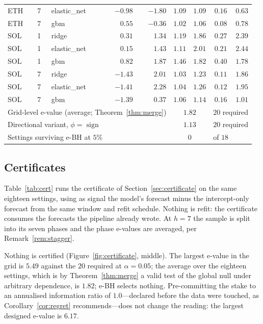 \documentclass{article}
\theoremstyle{plain}
\theoremstyle{definition}
\begin{document}
\begin{table}[t]
\begin{tabular}{lllrrrrrr}
    ETH & 7 & elastic\_net & $-0.98$ & $-1.80$ & $1.09$ & $1.09$ & $0.16$ & $0.63$ \\
    ETH & 7 & gbm & $0.55$ & $-0.36$ & $1.02$ & $1.06$ & $0.08$ & $0.78$ \\
    SOL & 1 & ridge & $0.31$ & $1.34$ & $1.19$ & $1.86$ & $0.27$ & $2.39$ \\
    SOL & 1 & elastic\_net & $0.15$ & $1.43$ & $1.11$ & $2.01$ & $0.21$ & $2.44$ \\
    SOL & 1 & gbm & $0.82$ & $1.87$ & $1.46$ & $1.82$ & $0.40$ & $1.78$ \\
    SOL & 7 & ridge & $-1.43$ & $2.01$ & $1.03$ & $1.23$ & $0.11$ & $1.86$ \\
    SOL & 7 & elastic\_net & $-1.41$ & $2.28$ & $1.04$ & $1.26$ & $0.12$ & $1.95$ \\
    SOL & 7 & gbm & $-1.39$ & $0.37$ & $1.06$ & $1.14$ & $0.16$ & $1.01$ \\
    \midrule
    \multicolumn{5}{l}{Grid-level e-value (average; Theorem~\ref{thm:merge})}
      & \multicolumn{2}{c}{$1.82$} & \multicolumn{2}{l}{$20$ required} \\
    \multicolumn{5}{l}{Directional variant, $\phi=\operatorname{sign}$}
      & \multicolumn{2}{c}{$1.13$} & \multicolumn{2}{l}{$20$ required} \\
    \multicolumn{5}{l}{Settings surviving e-BH at $5\%$}
      & \multicolumn{2}{c}{$0$} & \multicolumn{2}{l}{of $18$} \\
    \bottomrule
  \end{tabular}
\end{table}

\subsection{Certificates}
\label{sec:results-cert}

Table~\ref{tab:cert} runs the certificate of Section~\ref{sec:certificate} on the same
eighteen settings, using as signal the model's forecast minus the intercept-only forecast
from the same window and refit schedule. Nothing is refit: the certificate consumes the
forecasts the pipeline already wrote. At $h=7$ the sample is split into its seven phases and
the phase e-values are averaged, per Remark~\ref{rem:stagger}.

Nothing is certified (Figure~\ref{fig:certificate}, middle). The largest e-value in the grid
is $5.49$ against the $20$ required at $\alpha=0.05$; the average over the eighteen settings,
which is by Theorem~\ref{thm:merge} a valid test of the global null under arbitrary
dependence, is $1.82$; e-BH selects nothing. Pre-committing the stake to an annualised
information ratio of $1.0$---declared before the data were touched, as
Corollary~\ref{cor:regret} recommends---does not change the reading: the largest designed
e-value is $6.17$.
\end{document}
